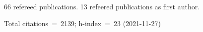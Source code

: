 66 refereed publications. 13 refeered publications as first author.

Total citations~=~2139; h-index~=~23 (2021-11-27)